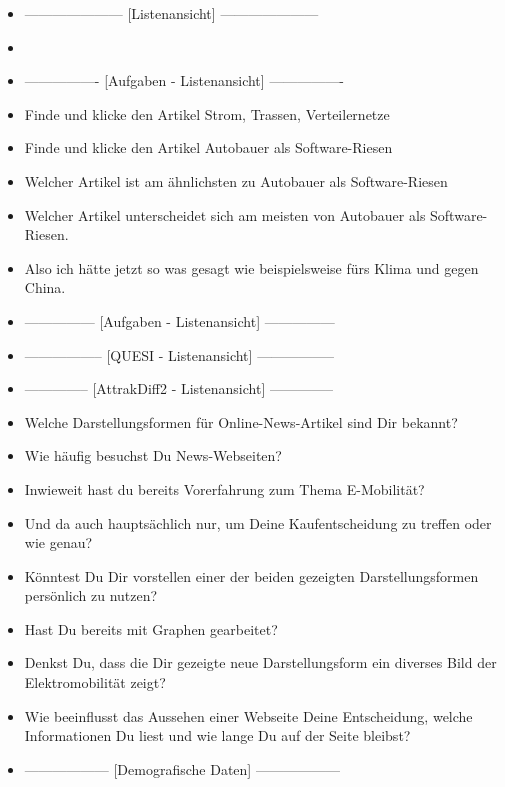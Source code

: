 {\begin{itemize}[]
    \item {---------------------} [Listenansicht] {---------------------}
    \item {} 
    \item {----------------} [Aufgaben - Listenansicht] {----------------}
    \item {} Finde und klicke den Artikel \flqq Strom, Trassen, Verteilernetze\frqq{}
    \item {} Finde und klicke den Artikel \flqq Autobauer als Software-Riesen\frqq{}
    \item {} Welcher Artikel ist am ähnlichsten zu \flqq Autobauer als Software-Riesen\frqq{}
    \item {} Welcher Artikel unterscheidet sich am meisten von \flqq Autobauer als Software-Riesen\frqq{}.
    \item {} Also ich hätte jetzt so was gesagt wie beispielsweise \flqq fürs Klima und gegen China\frqq{}. 
    \item {---------------} [Aufgaben - Listenansicht] {---------------}
    \item {-----------------} [QUESI - Listenansicht] {-----------------}
    \item {--------------} [AttrakDiff2 - Listenansicht] {--------------}
    \item {} Welche Darstellungsformen für Online-News-Artikel sind Dir bekannt?
    \item {} Wie häufig besuchst Du News-Webseiten?
    \item {} Inwieweit hast du bereits Vorerfahrung zum Thema E-Mobilität?
    \item {} Und da auch hauptsächlich nur, um Deine Kaufentscheidung zu treffen oder wie genau?
    \item {} Könntest Du Dir vorstellen einer der beiden gezeigten Darstellungsformen persönlich zu nutzen?
    \item {} Hast Du bereits mit Graphen gearbeitet?
    \item {} Denkst Du, dass die Dir gezeigte neue Darstellungsform ein diverses Bild der Elektromobilität zeigt?
    \item {} Wie beeinflusst das Aussehen einer Webseite Deine Entscheidung, welche Informationen Du liest und wie lange Du auf der Seite bleibst?
    \item {------------------} [Demografische Daten] {------------------}
\end{itemize}}
\nolinenumbers
